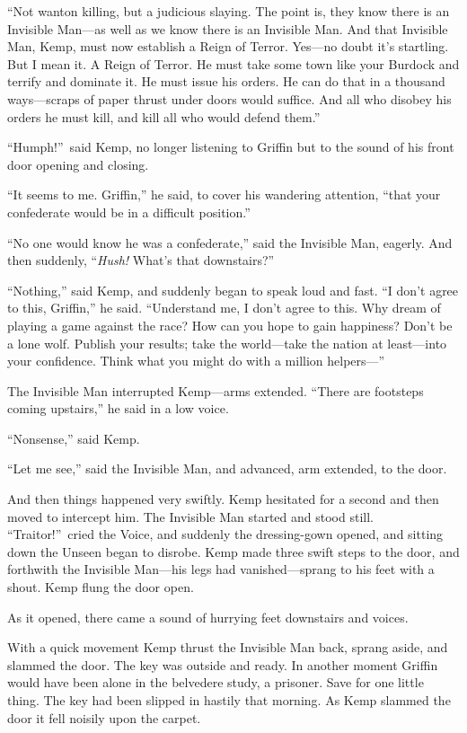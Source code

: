 “Not wanton killing, but a judicious slaying. The point is, they know there is an Invisible Man—as well as we know there is an Invisible Man. And that Invisible Man, Kemp, must now establish a Reign of Terror. Yes—no doubt it’s startling. But I mean it. A Reign of Terror. He must take some town like your Burdock and terrify and dominate it. He must issue his orders. He can do that in a thousand ways—scraps of paper thrust under doors would suffice. And all who disobey his orders he must kill, and kill all who would defend them.”

“Humph!”\ said Kemp, no longer listening to Griffin but to the sound of his front door opening and closing.

“It seems to me. Griffin,” he said, to cover his wandering attention, “that your confederate would be in a difficult position.”

“No one would know he was a confederate,” said the Invisible Man, eagerly. And then suddenly, “\emph{Hush!} What’s that downstairs?”

“Nothing,” said Kemp, and suddenly began to speak loud and fast. “I don’t agree to this, Griffin,” he said. “Understand me, I don’t agree to this. Why dream of playing a game against the race? How can you hope to gain happiness? Don’t be a lone wolf. Publish your results; take the world—take the nation at least—into your confidence. Think what you might do with a million helpers—”

The Invisible Man interrupted Kemp—arms extended. “There are footsteps coming upstairs,” he said in a low voice.

“Nonsense,” said Kemp.

“Let me see,” said the Invisible Man, and advanced, arm extended, to the door.

And then things happened very swiftly. Kemp hesitated for a second and then moved to intercept him. The Invisible Man started and stood still. “Traitor!”\ cried the Voice, and suddenly the dressing-gown opened, and sitting down the Unseen began to disrobe. Kemp made three swift steps to the door, and forthwith the Invisible Man—his legs had vanished—sprang to his feet with a shout. Kemp flung the door open.

As it opened, there came a sound of hurrying feet downstairs and voices.

With a quick movement Kemp thrust the Invisible Man back, sprang aside, and slammed the door. The key was outside and ready. In another moment Griffin would have been alone in the belvedere study, a prisoner. Save for one little thing. The key had been slipped in hastily that morning. As Kemp slammed the door it fell noisily upon the carpet.

